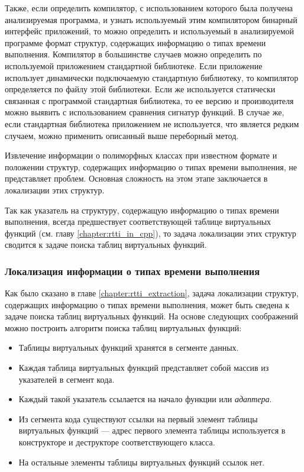 Также, если определить компилятор, с использованием которого была получена анализируемая программа, и узнать используемый этим компилятором бинарный интерфейс приложений, то можно определить и используемый в анализируемой программе формат структур, содержащих информацию о типах времени выполнения. Компилятор в большинстве случаев можно определить по используемой приложением стандартной библиотеке. Если приложение использует динамически подключаемую стандартную библиотеку, то компилятор определяется по файлу этой библиотеки. Если же используется статически связанная с программой стандартная библиотека, то ее версию и производителя можно выявить с использованием сравнения сигнатур функций. В случае же, если стандартная библиотека приложением не используется, что является редким случаем, можно применить описанный выше переборный метод.

Извлечение информации о полиморфных классах при известном формате и положении структур, содержащих информацию о типах времени выполнения, не представляет проблем. Основная сложность на этом этапе заключается в локализации этих структур.

Так как указатель на структуру, содержащую информацию о типах времени выполнения, всегда предшествует соответствующей таблице виртуальных функций (см. главу \ref{chapter:rtti_in_cpp}), то задача локализации этих структур сводится к задаче поиска таблиц виртуальных функций.




\subsubsection{Локализация информации о типах времени выполнения}\label{chapter:finding_rtti_structures}
Как было сказано в главе \ref{chapter:rtti_extraction}, задача локализации структур, содержащих информацию о типах времени выполнения, может быть сведена к задаче поиска таблиц виртуальных функций. На основе следующих соображений можно построить алгоритм поиска таблиц виртуальных функций:

\begin{itemize}
\item Таблицы виртуальных функций хранятся в сегменте данных.
\item Каждая таблица виртуальных функций представляет собой массив из указателей в сегмент кода.
\item Каждый такой указатель ссылается на начало функции или {\it адаптера}.
\item Из сегмента кода существуют ссылки на первый элемент таблицы виртуальных функций --- адрес первого элемента таблицы используется в конструкторе и деструкторе соответствующего класса.
\item На остальные элементы таблицы виртуальных функций ссылок нет.
\end{itemize}

